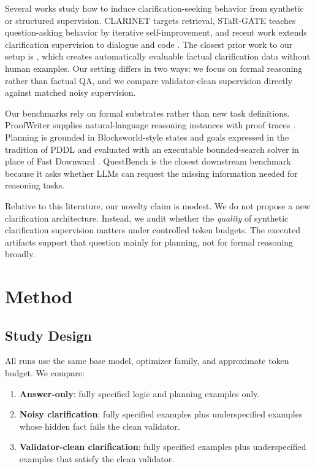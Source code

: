 Several works study how to induce clarification-seeking behavior from synthetic or structured supervision. CLARINET \citep{chi2024clarinet} targets retrieval, STaR-GATE \citep{andukuri2024stargate} teaches question-asking behavior by iterative self-improvement, and recent work extends clarification supervision to dialogue and code \citep{zhang2025modeling,wu2025clarifycoder}. The closest prior work to our setup is \citet{toles2025factualclarification}, which creates automatically evaluable factual clarification data without human examples. Our setting differs in two ways: we focus on formal reasoning rather than factual QA, and we compare validator-clean supervision directly against matched noisy supervision.

Our benchmarks rely on formal substrates rather than new task definitions. ProofWriter supplies natural-language reasoning instances with proof traces \citep{tafjord2021proofwriter}. Planning is grounded in Blocksworld-style states and goals expressed in the tradition of PDDL \citep{mcdermott1998pddl} and evaluated with an executable bounded-search solver in place of Fast Downward \citep{helmert2006fastdownward}. QuestBench \citep{li2025questbench} is the closest downstream benchmark because it asks whether LLMs can request the missing information needed for reasoning tasks.

Relative to this literature, our novelty claim is modest. We do not propose a new clarification architecture. Instead, we audit whether the \emph{quality} of synthetic clarification supervision matters under controlled token budgets. The executed artifacts support that question mainly for planning, not for formal reasoning broadly.

\section{Method}
\label{sec:method}
\subsection{Study Design}
All runs use the same base model, optimizer family, and approximate token budget. We compare:
\begin{enumerate}[leftmargin=*]
  \item \textbf{Answer-only}: fully specified logic and planning examples only.
  \item \textbf{Noisy clarification}: fully specified examples plus underspecified examples whose hidden fact fails the clean validator.
  \item \textbf{Validator-clean clarification}: fully specified examples plus underspecified examples that satisfy the clean validator.
\end{enumerate}

